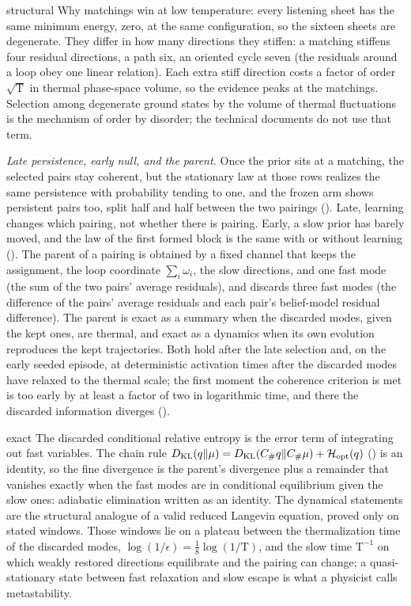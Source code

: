 \begin{analogy}{structural}
Why matchings win at low temperature: every listening sheet has the same minimum energy, zero, at the
same configuration, so the sixteen sheets are degenerate. They differ in how many directions they
stiffen: a matching stiffens four residual directions, a path six, an oriented cycle seven (the residuals
around a loop obey one linear relation). Each extra stiff direction costs a factor of order
$\sqrt{\mathrm T}$ in thermal phase-space volume, so the evidence peaks at the matchings. Selection among
degenerate ground states by the volume of thermal fluctuations is the mechanism of order by disorder; the
technical documents do not use that term.
\end{analogy}

\emph{Late persistence, early null, and the parent.} Once the prior sits at a matching, the selected pairs
stay coherent, but the stationary law at those rows realizes the same persistence with probability
tending to one, and the frozen arm shows persistent pairs too, split half and half between the two
pairings (). Late, learning changes which pairing, not whether
there is pairing. Early, a slow prior has barely moved, and the law of the first formed block is the same
with or without learning (). The parent of a pairing is obtained by a fixed
channel that keeps the assignment, the loop coordinate $\sum_i\omega_i$, the slow directions, and one
fast mode (the sum of the two pairs' average residuals), and discards three fast modes (the difference of
the pairs' average residuals and each pair's belief-model residual difference). The parent is exact as a
summary when the discarded modes, given the kept ones, are thermal, and exact as a dynamics when its own
evolution reproduces the kept trajectories. Both hold after the late selection and, on the early seeded
episode, at deterministic activation times after the discarded modes have relaxed to the thermal scale;
the first moment the coherence criterion is met is too early by at least a factor of two in logarithmic
time, and there the discarded information diverges ().

\begin{analogy}{exact}
The discarded conditional relative entropy is the error term of integrating out fast variables. The
chain rule $D_{\mathrm{KL}}(q\Vert\mu)=D_{\mathrm{KL}}(C_\#q\Vert C_\#\mu)+\mathcal H_{\mathrm{opt}}(q)$
() is an identity, so the fine divergence is the parent's
divergence plus a remainder that vanishes exactly when the fast modes are in conditional equilibrium given
the slow ones: adiabatic elimination written as an identity. The dynamical statements are the structural
analogue of a valid reduced Langevin equation, proved only on stated windows. Those windows lie on a
plateau between the thermalization time of the discarded modes, $\log(1/\epsilon)=\tfrac18\log(1/\mathrm
T)$, and the slow time $\mathrm T^{-1}$ on which weakly restored directions equilibrate and the pairing
can change; a quasi-stationary state between fast relaxation and slow escape is what a physicist calls
metastability.
\end{analogy}

